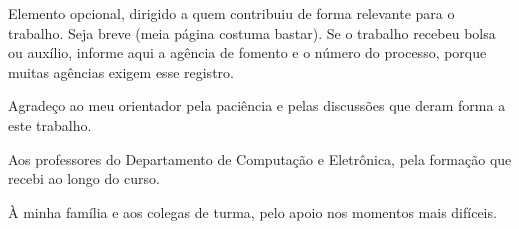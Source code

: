 \begin{agradecimentos}
\begin{instrucao}
Elemento opcional, dirigido a quem contribuiu de forma relevante para o
trabalho. Seja breve (meia página costuma bastar). Se o trabalho recebeu bolsa
ou auxílio, informe aqui a agência de fomento e o número do processo, porque
muitas agências exigem esse registro.
\end{instrucao}

Agradeço ao meu orientador pela paciência e pelas discussões que deram forma a
este trabalho.

Aos professores do Departamento de Computação e Eletrônica, pela formação que
recebi ao longo do curso.

À minha família e aos colegas de turma, pelo apoio nos momentos mais difíceis.
\end{agradecimentos}
